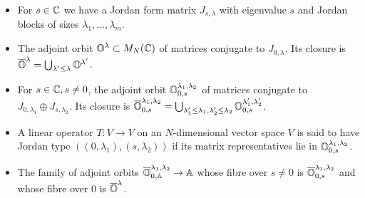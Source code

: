\documentclass[draft]{article}
\begin{document}
\begin{itemize}
    \item For $ s \in \mathbb C$ 
    we have a Jordan form matrix $ J_{s,\lambda}$ with eigenvalue $ s$ and Jordan blocks of sizes $ \lambda_1, \dots, \lambda_m$. 
    \item The adjoint orbit $ \mathbb O^\lambda \subset M_N(\mathbb C)$ of matrices conjugate to $ J_{0,\lambda}$.  Its closure is $ \overline{\mathbb O}^\lambda = \bigcup_{\lambda' \le \lambda} \mathbb O^{\lambda'}$.
    \item For $ s \in \mathbb C, s \ne 0$, the adjoint orbit $ \mathbb O^{\lambda_1, \lambda_2}_{0,s}$ of matrices conjugate to $ J_{0,\lambda_1} \oplus J_{s,\lambda_2}$.  Its closure is $ \overline{\mathbb O}^{\lambda_1, \lambda_2}_{0,s} = \bigcup_{\lambda_1' \le \lambda_1, \lambda'_2 \le \lambda_2} \mathbb O^{\lambda_1', \lambda'_2}_{0,s}$. 
    \item A linear operator $ T : V \rightarrow V $ on an $N$-dimensional vector space $V$ is said to have Jordan type $((0,\lambda_1), (s,\lambda_2))$ if its matrix representatives lie in $ \mathbb O^{\lambda_1, \lambda_2}_{0,s}$.
    \item The family of adjoint orbits $ \overline{\mathbb O}^{\lambda_1, \lambda_2}_{0,\mathbb A} \rightarrow \mathbb A$ whose fibre over $ s \ne 0 $ is $ \overline{\mathbb O}^{\lambda_1, \lambda_2}_{0,s}$ and whose fibre over 0 is $\overline{\mathbb O}^\lambda$.  
    
    

\end{itemize}
\end{document}
